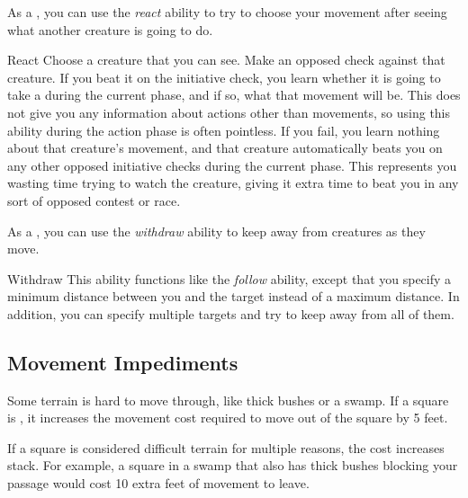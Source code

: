         \label{React} As a , you can use the \textit{react} ability to try to choose your movement after seeing what another creature is going to do.

        \begin{activeability}{React}
            \rankline
            Choose a creature that you can see.
            Make an opposed  check against that creature.
            If you beat it on the initiative check, you learn whether it is going to take a  during the current phase, and if so, what that movement will be.
            This does not give you any information about actions other than movements, so using this ability during the action phase is often pointless.
            If you fail, you learn nothing about that creature's movement, and that creature automatically beats you on any other opposed initiative checks during the current phase.
            This represents you wasting time trying to watch the creature, giving it extra time to beat you in any sort of opposed contest or race.
        \end{activeability}

        \label{Withdraw} As a , you can use the \textit{withdraw} ability to keep away from creatures as they move.

        \begin{activeability}{Withdraw}
            \rankline
            This ability functions like the \textit{follow} ability, except that you specify a minimum distance between you and the target instead of a maximum distance.
            In addition, you can specify multiple targets and try to keep away from all of them.
        \end{activeability}

    \subsection{Movement Impediments}

        \label{Difficult Terrain}
        Some terrain is hard to move through, like thick bushes or a swamp.
        If a square is , it increases the movement cost required to move out of the square by 5 feet.

        If a square is considered difficult terrain for multiple reasons, the cost increases stack.
        For example, a square in a swamp that also has thick bushes blocking your passage would cost 10 extra feet of movement to leave.

